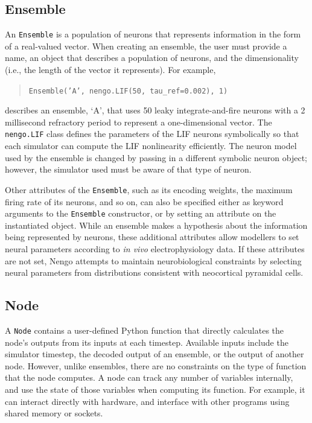 \documentclass{frontiersSCNS}
\begin{document}
\subsection{Ensemble}

An \texttt{Ensemble} is
a population of neurons
that represents information
in the form of a real-valued vector.
When creating an ensemble,
the user must provide a name,
an object that describes
a population of neurons,
and the dimensionality
(i.e., the length of the vector it represents).
For example,
\begin{quote}
  \texttt{Ensemble('A', nengo.LIF(50, tau\_ref=0.002), 1)}
\end{quote}
describes an ensemble, `A',
that uses 50 leaky integrate-and-fire neurons \citep{lapicque1907}
with a 2 millisecond refractory period
to represent a one-dimensional vector.
The \texttt{nengo.LIF} class defines
the parameters of the LIF neurons symbolically
so that each simulator can compute
the LIF nonlinearity efficiently.
The neuron model used by the ensemble
is changed by passing in a different symbolic neuron object;
however, the simulator used must be aware
of that type of neuron.

Other attributes of the \texttt{Ensemble},
such as its encoding weights,
the maximum firing rate of its neurons,
and so on, can also be specified
either as keyword arguments
to the \texttt{Ensemble} constructor,
or by setting an attribute on the instantiated object.
While an ensemble makes a hypothesis
about the information being represented by neurons,
these additional attributes
allow modellers to set
neural parameters according to \textit{in vivo}
electrophysiology data.
If these attributes are not set,
Nengo attempts to maintain
neurobiological constraints
by selecting neural parameters
from distributions consistent with
neocortical pyramidal cells.

\subsection{Node}

A \texttt{Node} contains a user-defined
Python function that directly calculates
the node's outputs from its inputs at each timestep.
Available inputs include
the simulator timestep,
the decoded output of an ensemble,
or the output of another node.
However, unlike ensembles,
there are no constraints on the type
of function that the node computes.
A node can track any number of variables internally,
and use the state of those variables
when computing its function.
For example, it can interact directly with hardware,
and interface with other programs
using shared memory or sockets.
\end{document}
